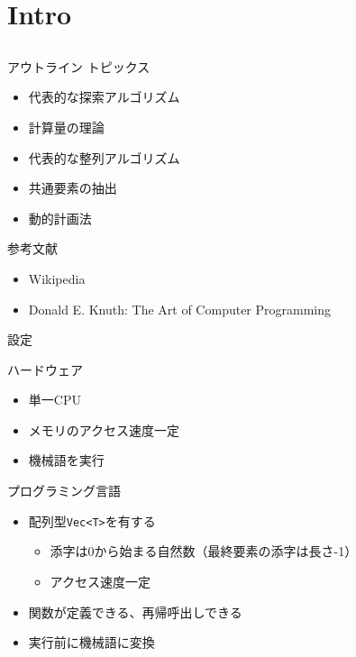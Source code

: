 \documentclass{beamer}
\subtitle{探索}
\begin{document}
\begin{frame}[fragile]{}
\titlepage
\end{frame}

\section{Intro}		%
\subsection{}

\begin{frame}[fragile]{アウトライン}{}
トピックス
\begin{itemize}
\item 代表的な探索アルゴリズム
\item 計算量の理論
\item 代表的な整列アルゴリズム
\item 共通要素の抽出
\item 動的計画法
\end{itemize}

\vfill
参考文献
\begin{itemize}
\item Wikipedia
\item Donald E. Knuth: The Art of Computer Programming
\end{itemize}
\end{frame}

\begin{frame}[fragile]{設定}{}

\begin{exampleblock}{ハードウェア}
\begin{itemize}%
\item 単一CPU
\item メモリのアクセス速度一定
\item 機械語を実行
\end{itemize}
\end{exampleblock}

\begin{exampleblock}{プログラミング言語}
\begin{itemize}%
\item 配列型{\tt Vec<T>}を有する
\begin{itemize}%
\item 添字は0から始まる自然数（最終要素の添字は長さ-1）
\item アクセス速度一定
\end{itemize}
\item 関数が定義できる、再帰呼出しできる
\item 実行前に機械語に変換
\end{itemize}
\end{exampleblock}
\end{frame}
\end{document}
